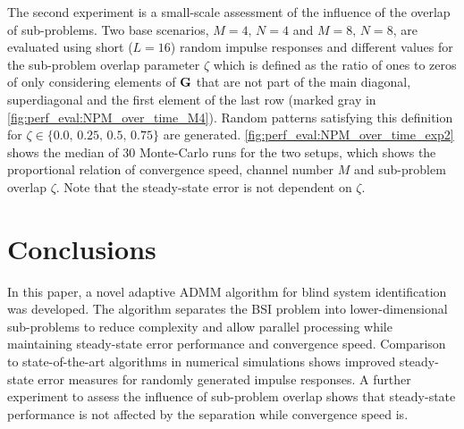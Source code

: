 \documentclass{article}
\begin{document}
The second experiment is a small-scale assessment of the influence of the overlap of sub-problems.
Two base scenarios, \(M=4,\,N=4\) and \(M=8,\,N=8\), are evaluated using short (\(L=16\)) random impulse responses and different values for the sub-problem overlap parameter \(\zeta\) which is defined as the ratio of ones to zeros of only considering elements of \(\bm{\mathrm{G}}\) that are not part of the main diagonal, superdiagonal and the first element of the last row (marked gray in \autoref{fig:perf_eval:NPM_over_time_M4}).
Random patterns satisfying this definition for \(\zeta \in \{0.0,\,0.25,\,0.5,\,0.75\}\) are generated.
\autoref{fig:perf_eval:NPM_over_time_exp2} shows the median of 30 Monte-Carlo runs for the two setups, which shows the proportional relation of convergence speed, channel number \(M\) and sub-problem overlap \(\zeta\).
Note that the steady-state error is not dependent on \(\zeta\).




\section{Conclusions}
\label{sec:conclusion}
In this paper, a novel adaptive ADMM algorithm for blind system identification was developed.
The algorithm separates the BSI problem into lower-dimensional sub-problems to reduce complexity and allow parallel processing while maintaining steady-state error performance and convergence speed.
Comparison to state-of-the-art algorithms in numerical simulations shows improved steady-state error measures for randomly generated impulse responses.
A further experiment to assess the influence of sub-problem overlap shows that steady-state performance is not affected by the separation while convergence speed is.



\end{document}
